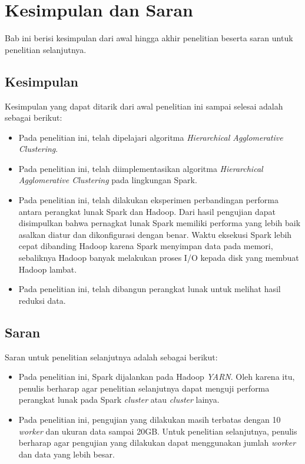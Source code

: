 \chapter{Kesimpulan dan Saran}

Bab ini berisi kesimpulan dari awal hingga akhir penelitian beserta saran untuk penelitian selanjutnya.

\section{Kesimpulan}

Kesimpulan yang dapat ditarik dari awal penelitian ini sampai selesai adalah sebagai berikut:

\begin{itemize}

\item Pada penelitian ini, telah dipelajari algoritma  {\it Hierarchical Agglomerative Clustering}.

\item Pada penelitian ini, telah diimplementasikan algoritma {\it Hierarchical Agglomerative Clustering} pada lingkungan Spark.

\item Pada penelitian ini, telah dilakukan eksperimen perbandingan performa antara perangkat lunak Spark dan Hadoop. Dari hasil pengujian dapat disimpulkan bahwa pernagkat lunak Spark memiliki performa yang lebih baik asalkan diatur dan dikonfigurasi dengan benar. Waktu eksekusi Spark lebih cepat dibanding Hadoop karena Spark menyimpan data pada memori, sebaliknya Hadoop banyak melakukan proses I/O kepada disk yang membuat Hadoop lambat.

\item Pada penelitian ini, telah dibangun perangkat lunak untuk melihat hasil reduksi data.

\end{itemize}

\section{Saran}

Saran untuk penelitian selanjutnya adalah sebagai berikut:

\begin{itemize}

\item Pada penelitian ini, Spark dijalankan pada Hadoop \textit{YARN}. Oleh karena itu, penulis berharap agar penelitian selanjutnya dapat menguji performa perangkat lunak pada Spark \textit{cluster} atau \textit{cluster} lainya.


\item Pada penelitian ini, pengujian yang dilakukan masih terbatas dengan 10 \textit{worker} dan ukuran data sampai 20GB. Untuk penelitian selanjutnya, penulis berharap agar pengujian yang dilakukan dapat menggunakan jumlah \textit{worker} dan data yang lebih besar.

\end{itemize}